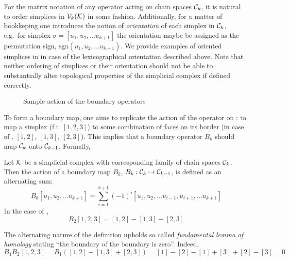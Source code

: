 For the matrix notation of any operator acting on chain spaces \( \mathcal{C}_k \), it is natural to order simplices in \( \mathcal{V}_{k}(\mathcal{K}) \) in some fashion. Additionally, for a matter of bookkeping one introduces the notion of \emph{orientation} of each simplex in \( \mathcal{C}_k \), e.g.~for simplex \( \sigma = [ u_1, u_2, \dots u_{k+1} ]\) the orientation maybe be assigned as the permutation sign, \( \mathrm{sgn}(u_1, u_2, \dots u_{k+1})\). We provide examples of oriented simplices in  in case of the lexicographical orientation described above. Note that neither ordering of simplices or their orientation should not be able to substantially alter topological properties of the simplicial complex if defined correctly.

\begin{figure}[hbtp]
      \centering
      
      \caption{ Sample action of the boundary operators \label{fig:boundary_sample} }
\end{figure}
To form a boundary map, one aims to replicate the action of the operator on : to map a simplex (f.i. \( [1, 2, 3] \)) to some combination of faces on its border (in case of , \( [1, 2]\), \( [1, 3]\), \( [2, 3]\)). This implies that a boundary operator \( B_k \) should map \( \mathcal{C}_k \) onto \( \mathcal{C}_{k-1} \). Formally,

\begin{definition}
      Let \( \mathcal{K} \) be a simplicial complex with corresponding family of chain spaces \( \mathcal{C}_k \). Then the action of a boundary map \( B_k\), \( B_k : \mathcal{C}_k \mapsto \mathcal{C}_{k-1 }\), is defined as an alternating sum:
      \begin{equation}
            B_k [ u_1, u_2, \dots u_{k+1} ] = \sum_{i=1}^{k+1} \left( -1 \right)^i [u_1, u_2, \dots u_{i-1}, u_{i+1}, \dots u_{k+1}]
      \end{equation}
      In the case of ,  
      \begin{equation}
            B_2 [ 1, 2, 3] = [1, 2] - [1, 3] + [2, 3]
      \end{equation}
\end{definition}
The alternating nature of the definition upholds so called \emph{fundamental lemma of homology} stating ``the boundary of the boundary is zero''. Indeed, 
\begin{equation}
      B_1 B_2 [1, 2, 3] = B_1 \left( [1, 2] - [1, 3] + [2, 3] \right) = [1] - [2] - [1] + [3] + [2] - [3] = 0
\end{equation}  

